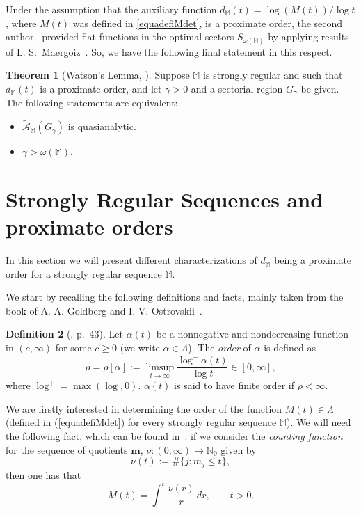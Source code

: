 \documentclass[11pt,a4paper]{article}
\theoremstyle{definition}
\newtheorem{theo}{Theorem}[section]
\newtheorem{defi}[theo]{Definition}
\def\a{\alpha}
\def\o{\omega}
\def\ga{\gamma}
\def\N{\mathbb{N}}
\def\M{\mathbb{M}}
\def\bm{\boldsymbol{m}}
\begin{document}
Under the assumption that the auxiliary function $d_{\M}(t)=\log(M(t))/\log t$, where $M(t)$ was defined in \eqref{equadefiMdet}, is a proximate order, the second author~\cite{SanzFlat} provided flat functions in the optimal sectors $S_{\o(\M)}$ by applying results of L. S.~Maergoiz~\cite{Maergoiz}. So, we have the following final statement in this respect.

\begin{theo}[Watson's Lemma, \cite{SanzFlat}]\label{coroWatsonlemma}
Suppose $\M$ is strongly regular and such that $d_{\M}(t)$ is a proximate order, and let $\ga>0$ and a sectorial region $G_\ga$ be given. The following statements are equivalent:
\begin{itemize}
\item[(i)] $\tilde{\mathcal{A}}_{\M}(G_{\gamma})$ is quasianalytic.
\item[(ii)] $\gamma>\omega(\M)$.
\end{itemize}
\end{theo}


\section{Strongly Regular Sequences and proximate orders}


In this section we will present different characterizations of $d_{\M}$ being a proximate order for a strongly regular sequence $\M$.

\noindent We start by recalling the following definitions and facts, mainly taken from
 the book of A. A. Goldberg and I. V. Ostrovskii~\cite{GoldbergOstrowskii}.


\begin{defi}[\cite{GoldbergOstrowskii}, p.\ 43]%
Let $\a(t)$ be a nonnegative and nondecreasing function in $(c,\infty)$ for some $c\ge 0$ (we write $\a\in\Lambda$).
The \textit{order} of $\a$ is defined as
$$
\rho=\rho[\a]:=\limsup_{t\to\infty}\frac{\log^+\a(t)}{\log t}\in[0,\infty],
$$
where $\log^+=\max(\log,0)$. $\a(t)$ is said to have finite order if $\rho<\infty$.
\end{defi}

We are firstly interested in determining the order of the function $M(t)\in\Lambda$ (defined in (\ref{equadefiMdet}) for every strongly regular sequence $\M$).
We will need the following fact, which can be found in~\cite{mandelbrojt}: if we consider the \textit{counting function} for the sequence of quotients $\bm$,
$\nu:(0,\infty)\to\N_0$ given by
\begin{equation}\label{equadefinuder}
\nu(t):=\#\{j:m_j\le t\},
\end{equation}
then one has that
\begin{equation}\label{equarelaMdetnuder}
M(t)=\int_0^t\frac{\nu(r)}{r}\,dr,\qquad t>0.
\end{equation}
\end{document}
